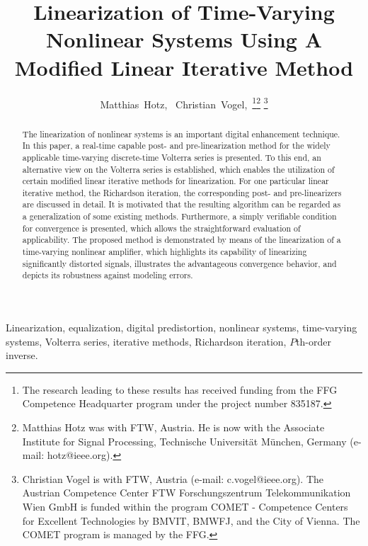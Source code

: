\documentclass[10pt,twocolumn,twoside]{IEEEtran}
\begin{document}
\title{Linearization of Time-Varying Nonlinear Systems Using A Modified Linear Iterative Method}

\author{Matthias~Hotz,~
        Christian~Vogel,~\thanks{The research leading to these results has received funding from the FFG
Competence Headquarter program under the project number 835187.}\thanks{Matthias Hotz was with FTW, Austria. He is now with the Associate Institute for
Signal Processing, Technische Universit{\"a}t M{\"u}nchen, Germany (e-mail: hotz@ieee.org).}
\thanks{Christian Vogel is with FTW, Austria (e-mail: c.vogel@ieee.org).
The Austrian Competence Center FTW Forschungszentrum Telekommunikation Wien GmbH
is funded within the program COMET - Competence Centers for Excellent Technologies
by BMVIT, BMWFJ, and the City of Vienna. The COMET program is managed by the FFG.}}

\maketitle


\begin{abstract}
The linearization of nonlinear systems is an important digital
enhancement technique. In this paper, a real-time capable post- and pre-linearization
method for the widely applicable time-varying discrete-time Volterra
series is presented. To this end, an alternative view on the Volterra
series is established, which enables the utilization of certain modified
linear iterative methods for linearization. For one particular linear
iterative method, the Richardson iteration, the corresponding post- and pre-linearizers are discussed
in detail. It is motivated that the resulting algorithm can be regarded
as a generalization of some existing methods. Furthermore, a simply verifiable
condition for convergence is presented, which allows the straightforward
evaluation of applicability. The proposed method is demonstrated by means
of the linearization of a time-varying nonlinear amplifier, which highlights
its capability of linearizing significantly distorted signals, illustrates the
advantageous convergence behavior, and depicts its robustness against modeling errors.
\end{abstract}

\begin{IEEEkeywords}
Linearization, equalization, digital predistortion, nonlinear systems, time-varying systems,
Volterra series, iterative methods, Richardson iteration, $P$th-order inverse. \end{IEEEkeywords}
\end{document}
